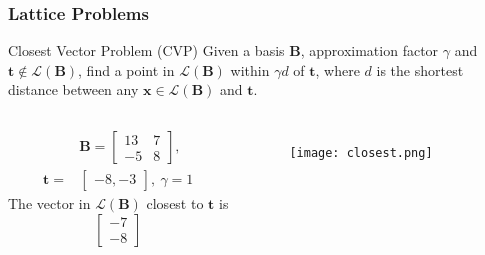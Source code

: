\documentclass{beamer}
\renewcommand{\v}{\mathbf}
\begin{document}
\begin{frame}
\frametitle{Lattice Problems}
\begin{block}{Closest Vector Problem (CVP)}
    Given a basis $\v{B}$, approximation factor $\gamma$ and 
    $\v{t} \notin \mathcal{L}(\v{B})$, find a point in 
    $\mathcal{L}(\v{B})$ within $\gamma d$ of $\v{t}$,
    where $d$ is the shortest distance between any $\v{x} \in 
    \mathcal{L}(\v{B})$ and $\v{t}$.
\end{block}
\begin{columns}
\begin{align*}
    &\v{B} = \begin{bmatrix}13 & 7 \\ -5 & 8 \end{bmatrix}, \\
    \v{t} = &\begin{bmatrix} -8, -3 \end{bmatrix},\ 
    \gamma = 1
\end{align*}
The vector in $\mathcal{L}(\v{B})$ closest to $\v{t}$ is
\[
    \begin{bmatrix} -7 \\ -8 \end{bmatrix}
\]
\begin{figure}
    \texttt{[image: closest.png]}
\end{figure}
\end{columns}
\end{frame}
\end{document}
